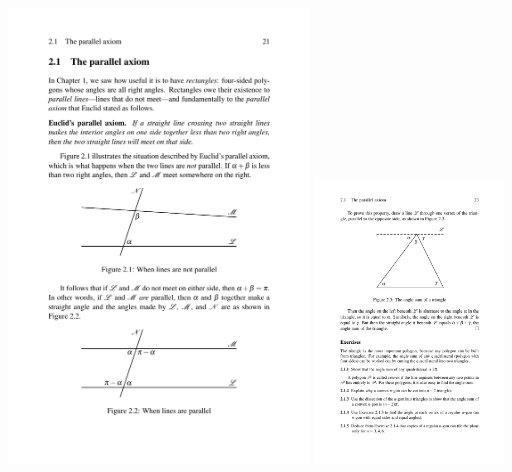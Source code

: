 \begin{center}
    \includegraphics[width=8cm]{BILDER/BildParallelenaxiom2.pdf}
    \hspace*{1cm}
    \includegraphics[width=5cm]{BILDER/BildInnenwinkelsatz.pdf}
\end{center}



